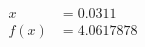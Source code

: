 \documentclass[preview]{standalone}
\begin{document}
\begin{align*}
x &= 0.0311\\f(x) &= 4.0617878
\end{align*}
\end{document}
